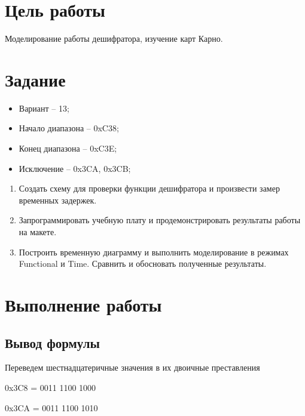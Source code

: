 \documentclass[a4paper,14pt]{article}
\begin{document}

\tableofcontents
\pagebreak

\section{Цель работы}

Моделирование работы дешифратора, изучение карт Карно.

\section{Задание}

\begin{itemize}
	\item Вариант -- 13;
	
	\item Начало диапазона -- 0xC38;
	
	\item Конец диапазона -- 0xC3E;
	
	\item Исключение -- 0x3CA, 0x3CB;
\end{itemize}

\begin{enumerate}
\item Создать схему для проверки функции дешифратора и произвести замер временных задержек.

\item Запрограммировать учебную плату и продемонстрировать результаты работы на макете.

\item Построить временную диаграмму и выполнить моделирование в режимах Functional и Time. Сравнить и обосновать полученные результаты.
\end{enumerate}



\section{Выполнение работы}

\subsection{Вывод формулы}

Переведем шестнадцатеричные значения в их двоичные преставления

0x3C8 = 0011 1100 1000

0x3CA = 0011 1100 1010
\end{document}
